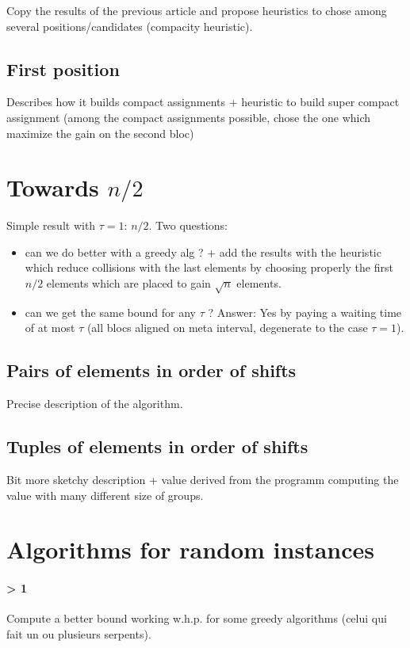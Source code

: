 \documentclass[10pt, conference, letterpaper]{IEEEtran}
\begin{document}
Copy the results of the previous article and propose heuristics to chose among several positions/candidates (compacity heuristic).

\subsection{First position}

Describes how it builds compact assignments 
+ heuristic to build super compact assignment (among the compact assignments
possible, chose the one which maximize the gain on the second bloc)

\section{Towards $n/2$}

Simple result with $\tau = 1$: $n/2$. 
Two questions:
\begin{itemize}
 \item can we do better with a greedy alg ?
+ add the results with the heuristic which reduce collisions with the last elements
by choosing properly the first $n/2$ elements which are placed to gain $\sqrt{n}$ elements. 
\item can we get the same bound for any $\tau$ ?
Answer: Yes by paying a waiting time of at most $\tau$ (all blocs aligned on meta interval,
degenerate to the case $\tau = 1$).
\end{itemize}

\subsection{Pairs of elements in order of shifts}

Precise description of the algorithm. 

\subsection{Tuples of elements in order of shifts}

Bit more sketchy description + value derived from the programm computing the value with many
different size of groups.

\section{Algorithms for random instances}

\paragraph{\tau > 1}
Compute a better bound working w.h.p. for some greedy algorithms (celui qui fait un ou plusieurs serpents). 
\end{document}
